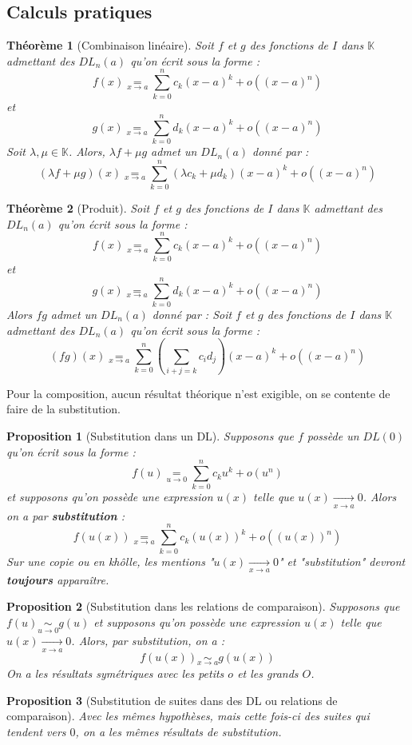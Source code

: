 \documentclass[french]{book}
\newcommand{\K}{\mathbb{K}}
\theoremstyle{plain}
\newtheorem{thm}{Théorème}[chapter]
\newtheorem{prop}{Proposition}[chapter]
\theoremstyle{definition}
\theoremstyle{remark}
\begin{document}
\subsection{Calculs pratiques}
\begin{thm}[Combinaison linéaire]
	Soit $f$ et $g$ des fonctions de $I$ dans $\K$ admettant des $DL_n(a)$ qu'on écrit sous la forme : $$f(x)\underset{x\to a}{=}\sum_{k=0}^{n}c_k(x-a)^k+o\left((x-a)^n\right)$$ et $$g(x)\underset{x\to a}{=}\sum_{k=0}^{n}d_k(x-a)^k+o\left((x-a)^n\right)$$ Soit $\lambda,\mu\in\K$. Alors, $\lambda f+\mu g$ admet un $DL_n(a)$ donné par : $$(\lambda f+\mu g)(x)\underset{x\to a}{=}\sum_{k=0}^{n}(\lambda c_k+\mu d_k)(x-a)^k+o\left((x-a)^n\right)$$
\end{thm}
\begin{thm}[Produit]
	Soit $f$ et $g$ des fonctions de $I$ dans $\K$ admettant des $DL_n(a)$ qu'on écrit sous la forme : $$f(x)\underset{x\to a}{=}\sum_{k=0}^{n}c_k(x-a)^k+o\left((x-a)^n\right)$$ et $$g(x)\underset{x\to a}{=}\sum_{k=0}^{n}d_k(x-a)^k+o\left((x-a)^n\right)$$ Alors $fg$ admet un $DL_n(a)$ donné par : Soit $f$ et $g$ des fonctions de $I$ dans $\K$ admettant des $DL_n(a)$ qu'on écrit sous la forme : $$(fg)(x)\underset{x\to a}{=}\sum_{k=0}^{n}\left(\sum_{i+j=k}c_i d_j\right)(x-a)^k+o\left((x-a)^n\right)$$
\end{thm}
Pour la composition, aucun résultat théorique n'est exigible, on se contente de faire de la substitution.
\begin{prop}[Substitution dans un DL]
	Supposons que $f$ possède un $DL(0)$ qu'on écrit sous la forme : $$f(u)\underset{u\to 0}{=}\sum_{k=0}^{n}c_ku^k+o\left(u^n\right)$$ et supposons qu'on possède une expression $u(x)$ telle que $u(x)\xrightarrow[x\to a]{} 0$. Alors on a par \textbf{substitution} : $$f(u(x))\underset{x\to a}{=}\sum_{k=0}^{n}c_k(u(x))^k+o\left((u(x))^n\right)$$ Sur une copie ou en khôlle, les mentions "$u(x)\xrightarrow[x\to a]{} 0$" et "substitution" devront \textbf{toujours} apparaître.
\end{prop}
\begin{prop}[Substitution dans les relations de comparaison]
	Supposons que $f(u)\underset{u\to 0}{\sim}g(u)$ et supposons qu'on possède une expression $u(x)$ telle que $u(x)\xrightarrow[x\to a]{} 0$. Alors, par substitution, on a : $$f(u(x))\underset{x\to a}{\sim}g(u(x))$$ On a les résultats symétriques avec les petits $o$ et les grands $O$.
\end{prop}
\begin{prop}[Substitution de suites dans des DL ou relations de comparaison]
	Avec les mêmes hypothèses, mais cette fois-ci des suites qui tendent vers $0$, on a les mêmes résultats de substitution.
\end{prop}
\end{document}
